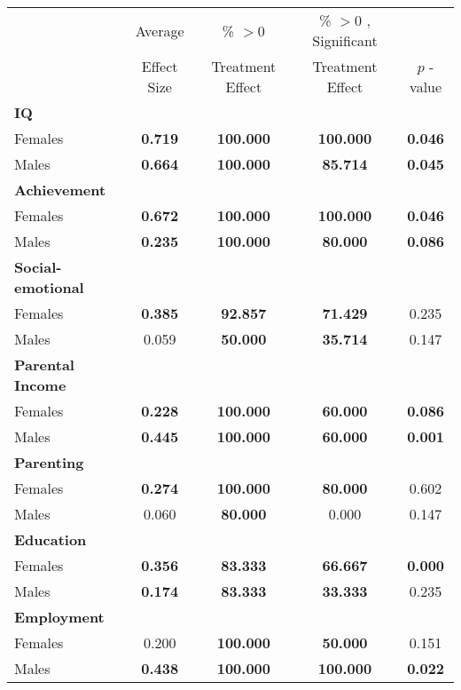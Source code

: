\begin{tabular}{l c c c c}
\toprule
 & Average & \% $ >0 $ & \% $ >0 $ , Significant & \citet{Rosenbaum_2005_Distribution_JRSS} \\
 & Effect Size & Treatment Effect & Treatment Effect & $ p $ -value \\
\midrule
\textbf{IQ} & & & & \\
\quad Females &  \textbf{    0.719} & \textbf{  100.000} & \textbf{  100.000} & \textbf{ 0.046} \\
\quad Males &  \textbf{    0.664} & \textbf{  100.000} & \textbf{   85.714} & \textbf{ 0.045} \\
\midrule
\textbf{Achievement} & & & & \\
\quad Females &  \textbf{    0.672} & \textbf{  100.000} & \textbf{  100.000} & \textbf{ 0.046} \\
\quad Males &  \textbf{    0.235} & \textbf{  100.000} & \textbf{   80.000} & \textbf{ 0.086} \\
\midrule
\textbf{Social-emotional} & & & & \\
\quad Females &  \textbf{    0.385} & \textbf{   92.857} & \textbf{   71.429} & 0.235 \\
\quad Males &      0.059 & \textbf{   50.000} & \textbf{   35.714} & 0.147 \\
\midrule
\textbf{Parental Income} & & & & \\
\quad Females &  \textbf{    0.228} & \textbf{  100.000} & \textbf{   60.000} & \textbf{ 0.086} \\
\quad Males &  \textbf{    0.445} & \textbf{  100.000} & \textbf{   60.000} & \textbf{ 0.001} \\
\midrule
\textbf{Parenting} & & & & \\
\quad Females &  \textbf{    0.274} & \textbf{  100.000} & \textbf{   80.000} & 0.602 \\
\quad Males &      0.060 & \textbf{   80.000} &     0.000 & 0.147 \\
\midrule
\textbf{Education} & & & & \\
\quad Females &  \textbf{    0.356} & \textbf{   83.333} & \textbf{   66.667} & \textbf{ 0.000} \\
\quad Males &  \textbf{    0.174} & \textbf{   83.333} & \textbf{   33.333} & 0.235 \\
\midrule
\textbf{Employment} & & & & \\
\quad Females &      0.200 & \textbf{  100.000} & \textbf{   50.000} & 0.151 \\
\quad Males &  \textbf{    0.438} & \textbf{  100.000} & \textbf{  100.000} & \textbf{ 0.022} \\

\end{tabular}
